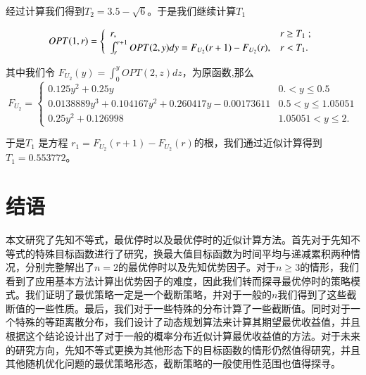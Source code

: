 \documentclass[bachelor]{thuthesis}
\begin{document}
经过计算我们得到$T_2=3.5-\sqrt6$。于是我们继续计算$T_1$

$$OPT(1,r)=\left\{
                \begin{array}{ll}
                  r , & \hbox{$r\geq T_1$ ;} \\
                 \int_{r}^{r+1} OPT(2,y)dy= F_{U_2}(r+1)-F_{U_2}(r), & \hbox{$r<T_1$.}
                \end{array}
              \right.$$

其中我们令 $F_{U_2}(y)=\int_{0}^{y} OPT(2,z)dz$，为原函数,那么
\[
F_{U_2}=
\left\{\begin{array}{ll}
 0.125 y^2+0.25 y & 0.<y\leq 0.5 \\
 0.0138889 y^3+0.104167 y^2+0.260417 y-0.00173611 & 0.5<y\leq 1.05051 \\
 0.25 y^2+0.126998 & 1.05051<y\leq 2.
\end{array}\right.
\]


于是$T_1$ 是方程 $r_1=F_{U_2}(r+1)-F_{U_2}(r)$的根，我们通过近似计算得到 $T_1=0.553772$。




\chapter{结语}
\label{cha:china}

本文研究了先知不等式，最优停时以及最优停时的近似计算方法。首先对于先知不等式的特殊目标函数进行了研究，换最大值目标函数为时间平均与递减累积两种情况，分别完整解出了$n=2$的最优停时以及先知优势因子。对于$n\ge 3$的情形，我们看到了应用基本方法计算出优势因子的难度，因此我们转而探寻最优停时的策略模式。我们证明了最优策略一定是一个截断策略，并对于一般的$n$我们得到了这些截断值的一些性质。最后，我们对于一些特殊的分布计算了一些截断值。同时对于一个特殊的等距离散分布，我们设计了动态规划算法来计算其期望最优收益值，并且根据这个结论设计出了对于一般的概率分布近似计算最优收益值的方法。对于未来的研究方向，先知不等式更换为其他形态下的目标函数的情形仍然值得研究，并且其他随机优化问题的最优策略形态，截断策略的一般使用性范围也值得探寻。











\backmatter

\makeatletter
\ifthu@bachelor
  \listofequations
\fi
\makeatother
\end{document}
